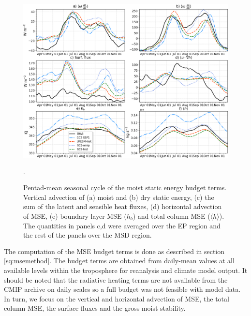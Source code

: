 \begin{figure}[t!]
\includegraphics[width=\linewidth]{figures/thermopentad}
\caption[Seasonal cycle of MSE budget terms]{Pentad-mean seasonal cycle of the moist static energy budget terms. Vertical advection of (a) moist and (b) dry static energy, (c) the sum of the latent and sensible heat fluxes, (d) horizontal advection of MSE, (e) boundary layer MSE ($h_b$) and total column MSE ($\langle h \rangle$). The quantities in panels c,d were averaged over the EP region and the rest of the panels over the MSD region. }. 
\label{fig:thermo_pentad}
\end{figure}



 The computation of the MSE budget terms is done as described in section \ref{sq:msemethod}. The budget terms are obtained from daily-mean values at all available levels within the troposphere for reanalysis and climate model output. It should be noted that the radiative heating terms are not available from the CMIP archive on daily scales so a full budget was not feasible with model data. In turn, we focus on the vertical and horizontal advection of MSE, the total column MSE, the surface fluxes and the gross moist stability.
 
